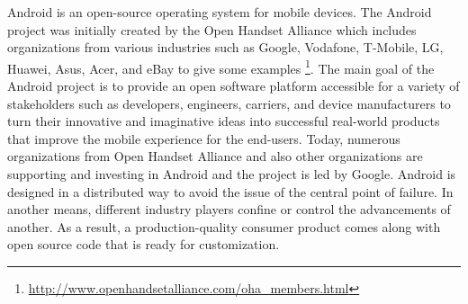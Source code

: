 Android is an open-source operating system for mobile devices. The Android project was initially created by the Open Handset Alliance which includes organizations from various industries such as Google, Vodafone, T-Mobile, LG, Huawei, Asus, Acer, and eBay to give some examples \footnote{\url{http://www.openhandsetalliance.com/oha_members.html}}. The main goal of the Android project is to provide an open software platform accessible for a variety of stakeholders such as developers, engineers, carriers, and device manufacturers to turn their innovative and imaginative ideas into successful real-world products that improve the mobile experience for the end-users. Today, numerous organizations from Open Handset Alliance and also other organizations are supporting and investing in Android and the project is led by Google. Android is designed in a distributed way to avoid the issue of the central point of failure. In another means, different industry players confine or control the advancements of another. As a result, a production-quality consumer product comes along with open source code that is ready for customization.